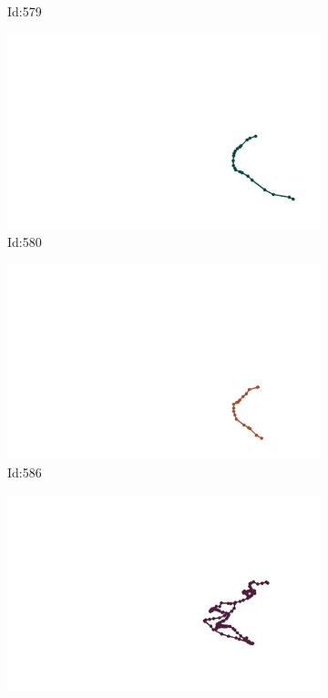 \documentclass[12pt,twoside]{report}
\begin{document}
\begin{figure}
\begin{subfigure}[b]{0.20\textwidth}
\caption{Id:579}
\end{subfigure}
\begin{subfigure}[b]{0.20\textwidth}
\centering
\includegraphics[width=\textwidth]{../trajectories/580.png}
\caption{Id:580}
\end{subfigure}
\begin{subfigure}[b]{0.20\textwidth}
\centering
\includegraphics[width=\textwidth]{../trajectories/586.png}
\caption{Id:586}
\end{subfigure}
\begin{subfigure}[b]{0.20\textwidth}
\centering
\includegraphics[width=\textwidth]{../trajectories/627.png}

\end{subfigure}
\end{figure}
\end{document}
